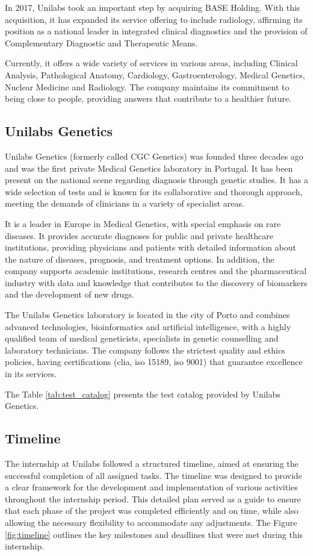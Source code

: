 In 2017, Unilabs took an important step by acquiring BASE Holding. With this acquisition, it has expanded its service offering to include radiology, affirming its position as a national leader in integrated clinical diagnostics and the provision of Complementary Diagnostic and Therapeutic Means. 

Currently, it offers a wide variety of services in various areas, including Clinical Analysis, Pathological Anatomy, Cardiology, Gastroenterology, Medical Genetics, Nuclear Medicine and Radiology. The company maintains its commitment to being close to people, providing answers that contribute to a healthier future. \cite{unilabs_sobre}

\subsection{Unilabs Genetics} \label{subsec:unilabs_genetics}
Unilabs Genetics (formerly called CGC Genetics) was founded three decades ago and was the first private Medical Genetics laboratory in Portugal. It has been present on the national scene regarding diagnosis through genetic studies. It has a wide selection of tests and is known for its collaborative and thorough approach, meeting the demands of clinicians in a variety of specialist areas. 

It is a leader in Europe in Medical Genetics, with special emphasis on rare diseases. It provides accurate diagnoses for public and private healthcare institutions, providing physicians and patients with detailed information about the nature of diseases, prognosis, and treatment options. In addition, the company supports academic institutions, research centres and the pharmaceutical industry with data and knowledge that contributes to the discovery of biomarkers and the development of new drugs. 

The Unilabs Genetics laboratory is located in the city of Porto and combines advanced technologies, bioinformatics and artificial intelligence, with a highly qualified team of medical geneticists, specialists in genetic counselling and laboratory technicians. The company follows the strictest quality and ethics policies, having certifications (\ac{clia}, \ac{iso} 15189, \ac{iso} 9001) that guarantee excellence in its services. \cite{unilabs_genetica}

The Table \ref{tab:test_catalog} presents the test catalog provided by Unilabs Genetics.

\subsection{Timeline} \label{subsec:timeline}
The internship at Unilabs followed a structured timeline, aimed at ensuring the successful completion of all assigned tasks. The timeline was designed to provide a clear framework for the development and implementation of various activities throughout the internship period. This detailed plan served as a guide to ensure that each phase of the project was completed efficiently and on time, while also allowing the necessary flexibility to accommodate any adjustments. The Figure \ref{fig:timeline} outlines the key milestones and deadlines that were met during this internship.

